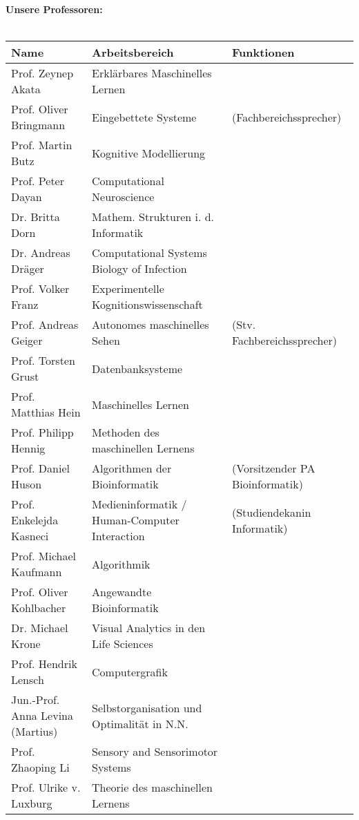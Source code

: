 \renewcommand{\arraystretch}{1}
\scriptsize
\textbf{Unsere Professoren:}\\\\
\begin{tabular}{|lll|}
\hline
Name                         		& Arbeitsbereich 						& Funktionen \\
\hline
\hline
Prof. Zeynep Akata           		& Erklärbares Maschinelles Lernen 				&\\
Prof. Oliver Bringmann       		& Eingebettete Systeme 					& (Fachbereichssprecher)\\
Prof. Martin Butz            		& Kognitive Modellierung 					&\\
Prof. Peter Dayan            		& Computational Neuroscience 					&\\
Dr. Britta Dorn       			& Mathem. Strukturen i. d. Informatik 			&\\
Dr. Andreas Dräger			& Computational Systems Biology of Infection 			&\\
Prof. Volker Franz			& Experimentelle Kognitionswissenschaft 			&\\ 
Prof. Andreas Geiger       		& Autonomes maschinelles Sehen				& (Stv. Fachbereichssprecher) \\
Prof. Torsten Grust	    		& Datenbanksysteme						&\\
Prof. Matthias Hein  			& Maschinelles Lernen 						&\\
Prof. Philipp Hennig			& Methoden des maschinellen Lernens 				&\\
Prof. Daniel Huson         		& Algorithmen der Bioinformatik 				& (Vorsitzender PA Bioinformatik) \\
Prof. Enkelejda Kasneci		& Medieninformatik / Human-Computer Interaction		& (Studiendekanin Informatik\footnotemark)\\
Prof. Michael Kaufmann        	& Algorithmik							&\\
Prof. Oliver Kohlbacher     		& Angewandte Bioinformatik 					&\\
Dr. Michael Krone 			& Visual Analytics in den Life Sciences 			&\\
Prof. Hendrik Lensch          	& Computergrafik						&\\ 
Jun.-Prof. Anna Levina (Martius)	& Selbstorganisation und Optimalität in N.N. 			&\\
Prof. Zhaoping Li			& Sensory and Sensorimotor Systems 				&\\
Prof. Ulrike v. Luxburg		& Theorie des maschinellen Lernens 				&\\

\end{tabular}
